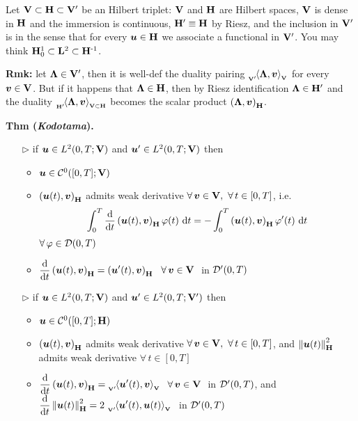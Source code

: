 Let $\mathbf{V}\subset\mathbf{H}\subset\mathbf{V}'$ be an Hilbert triplet: $\mathbf{V}$ and $\mathbf{H}$ are Hilbert spaces, $\mathbf{V}$ is dense in $\mathbf{H}$ and the immersion is continuous, $\mathbf{H}'\equiv\mathbf{H}$ by Riesz, and the inclusion in $\mathbf{V}'$ is in the sense that for every $\bm u \in\mathbf{H}$ we associate a functional in $\mathbf{V}'$. You may think $\mathbf{H}_0^1\subset\mathbf{L}^2\subset\mathbf{H}^{\text{-}1}$.

\smallskip

\textbf{Rmk:} let $\bm \Lambda \in\mathbf{V}'$, then it is well-def the duality pairing ${}_{_{\mathbf{V}'}}\!\langle \bm\Lambda,\bm v \rangle{}_{_{\mathbf{V}}}$ for every $\bm v \in \mathbf{V}$. But if it happens that $\bm \Lambda \in\mathbf{H}$, then by Riesz identification $\bm \Lambda \in\mathbf{H}'$ and the duality ${}_{_{\mathbf{H}'}}\!\langle \bm\Lambda,\bm v \rangle{}_{_{\mathbf{V}\subset\mathbf{H}}}$ becomes the scalar product $\left( \bm\Lambda,\bm v \right)_{\mathbf{H}}$.

\smallskip

\textbf{Thm (\emph{Kodotama}).} \leavevmode
\begin{itemize}
    \item[$\triangleright$] if $\bm u \in L^2(0,T;\mathbf{V})$ and $\bm u'\in L^2(0,T;\mathbf{V})$ then 
    \begin{itemize}
        \item $\bm u\in\mathcal{C}^0([0,T];\mathbf{V})$

        \item $\left( \bm u(t),\bm v \right)_{\mathbf{H}}$ admits weak derivative $\forall\, \bm v \in\Vv,\ \forall\,t\in[0,T]$, i.e.
        \begin{equation*}
        \int_0^T \frac{\mathrm{d}}{\mathrm{d} t} \left( \bm u(t),\bm v \right)_{\mathbf{H}}\varphi(t)\  \mathrm{d} t = -\int_0^T \left( \bm u(t),\bm v \right)_{\mathbf{H}} \varphi'(t)\  \mathrm{d} t
        \end{equation*}
        $\forall\, \varphi\in\mathcal{D}(0,T)$

        \item $\displaystyle \frac{\mathrm{d}}{\mathrm{d} t} \left( \bm u(t),\bm v \right)_{\mathbf{H}} =\left( \bm u'(t),\bm v \right)_{\mathbf{H}}$ $\ \forall\, \bm v \in\mathbf{V}\ $ in $\mathcal{D}'(0,T)$
    \end{itemize}

    \item[$\triangleright$] if $\bm u \in L^2(0,T;\mathbf{V})$ and $\bm u'\in L^2(0,T;\mathbf{V}')$ then 
    \begin{itemize}
        \item $\bm u\in\mathcal{C}^0([0,T];\mathbf{H})$

        \item $\left( \bm u(t),\bm v \right)_{\mathbf{H}}$ admits weak derivative $\forall\, \bm v \in\Vv,\ \forall\,t\in[0,T]$, and $\left\lVert \bm u(t) \right\rVert_{\mathbf{H}}^2$ admits weak derivative $\forall\,t\in[0,T]$

        \item $\displaystyle \frac{\mathrm{d}}{\mathrm{d} t} \left( \bm u(t),\bm v \right)_{\mathbf{H}} ={}_{_{\mathbf{V}'}}\!\langle  \bm u'(t),\bm v  \rangle{}_{_{\mathbf{V}}}$ $\ \forall\, \bm v \in\mathbf{V}\ $ in $\mathcal{D}'(0,T)$, and \\
        \vspace{0.5em}
        $\displaystyle \frac{\mathrm{d}}{\mathrm{d} t} \left\lVert \bm u(t) \right\rVert_{\mathbf{H}}^2 =2\ {}_{_{\mathbf{V}'}}\!\langle  \bm u'(t),\bm u(t)  \rangle{}_{_{\mathbf{V}}}\ $ in $\mathcal{D}'(0,T)$
    \end{itemize}
\end{itemize}

